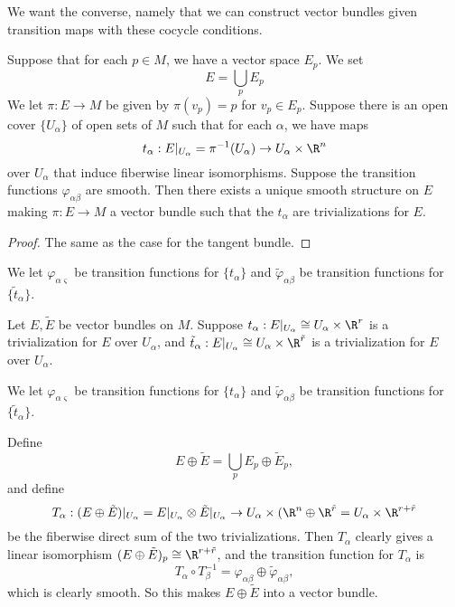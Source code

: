 \documentclass[a4paper]{article}
\begin{document}
We want the converse, namely that we can construct vector bundles given transition maps with these cocycle conditions.

\begin{prop}
  Suppose that for each $p \in M$, we have a vector space $E_p$. We set
  \[
    E = \bigcup_p E_p
  \]
  We let $\pi: E \to M$ be given by $\pi(v_p) = p$ for $v_p \in E_p$. Suppose there is an open cover $\{U_\alpha\}$ of open sets of $M$ such that for each $\alpha$, we have maps
  \[
    t_\alpha: E|_{U_\alpha} = \pi^{-1}(U_\alpha) \to U_\alpha \times \R^n
  \]
  over $U_\alpha$ that induce fiberwise linear isomorphisms. Suppose the transition functions $\varphi_{\alpha\beta}$ are smooth. Then there exists a unique smooth structure on $E$ making $\pi: E \to M$ a vector bundle such that the $t_\alpha$ are trivializations for $E$.
\end{prop}

\begin{proof}
  The same as the case for the tangent bundle.
\end{proof}

We let $\varphi_{\alpha\varsigma}$ be transition functions for $\{t_\alpha\}$ and $\tilde{\varphi}_{\alpha\beta}$ be transition functions for $\{\tilde{t}_\alpha\}$.

\begin{defi}
  Let $E, \tilde{E}$ be vector bundles on $M$. Suppose $t_\alpha: E|_{U_\alpha} \cong U_\alpha \times \R^r$ is a trivialization for $E$ over $U_\alpha$, and $\tilde{t}_\alpha: E|_{U_\alpha} \cong U_\alpha \times \R^{\tilde{r}}$ is a trivialization for $E$ over $U_\alpha$.

  We let $\varphi_{\alpha\varsigma}$ be transition functions for $\{t_\alpha\}$ and $\tilde{\varphi}_{\alpha\beta}$ be transition functions for $\{\tilde{t}_\alpha\}$.

  Define
  \[
    E \oplus \tilde{E} = \bigcup_p E_p \oplus \tilde{E}_p,
  \]
  and define
  \[
    T_\alpha: (E \oplus \tilde{E})|_{U_\alpha} = E|_{U_\alpha} \otimes \tilde{E}|_{U_\alpha} \to U_\alpha \times (\R^n \oplus \R^{\tilde{r}} = U_\alpha \times \R^{r + \tilde{r}}
  \]
  be the fiberwise direct sum of the two trivializations. Then $T_\alpha$ clearly gives a linear isomorphism $(E \oplus \tilde{E})_p \cong \R^{r + \tilde{r}}$, and the transition function for $T_\alpha$ is
  \[
    T_\alpha \circ T_\beta^{-1} = \varphi_{\alpha\beta} \oplus \tilde{\varphi}_{\alpha\beta},
  \]
  which is clearly smooth. So this makes $E \oplus \tilde{E}$ into a vector bundle.
\end{defi}
\end{document}
